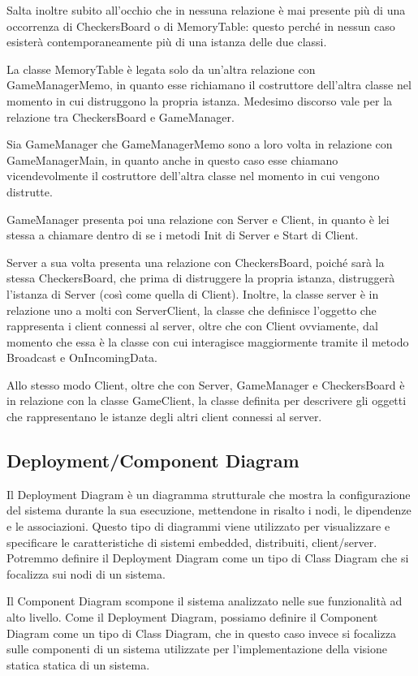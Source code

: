 \documentclass[12pt]{article}
\begin{document}
Salta inoltre subito all'occhio che in nessuna relazione è mai presente più di una occorrenza di CheckersBoard o di MemoryTable: questo perché in nessun caso esisterà contemporaneamente più di una istanza delle due classi.

La classe MemoryTable è legata solo da un'altra relazione con GameManagerMemo, in quanto esse richiamano il costruttore dell'altra classe nel momento in cui distruggono la propria istanza. Medesimo discorso vale per la relazione tra CheckersBoard e GameManager.

Sia GameManager che GameManagerMemo sono a loro volta in relazione con GameManagerMain, in quanto anche in questo caso esse chiamano vicendevolmente il costruttore dell'altra classe nel momento in cui vengono distrutte.

GameManager presenta poi una relazione con Server e Client, in quanto è lei stessa a chiamare dentro di se i metodi Init di Server e Start di Client.

Server a sua volta presenta una relazione con CheckersBoard, poiché sarà la stessa CheckersBoard, che prima di distruggere la propria istanza, distruggerà l'istanza di Server (così come quella di Client). Inoltre, la classe server è in relazione uno a molti con ServerClient, la classe che definisce l'oggetto che rappresenta i client connessi al server, oltre che con Client ovviamente, dal momento che essa è la classe con cui interagisce maggiormente tramite il metodo Broadcast e OnIncomingData.

Allo stesso modo Client, oltre che con Server, GameManager e CheckersBoard è in relazione con la classe GameClient, la classe definita per descrivere gli oggetti che rappresentano le istanze degli altri client connessi al server.

\subsection{Deployment/Component Diagram}
Il Deployment Diagram è un diagramma strutturale che mostra la configurazione del sistema durante la sua esecuzione, mettendone in risalto i nodi, le dipendenze e le associazioni. Questo tipo di diagrammi viene utilizzato per visualizzare e specificare le caratteristiche di sistemi embedded, distribuiti, client/server. Potremmo definire il Deployment Diagram come un tipo di Class Diagram che si focalizza sui nodi di un sistema.

Il Component Diagram scompone il sistema analizzato nelle sue funzionalità ad alto livello. Come il Deployment Diagram, possiamo definire il Component Diagram come un tipo di Class Diagram, che in questo caso invece si focalizza sulle componenti di un sistema utilizzate per l'implementazione della visione statica statica di un sistema.
\end{document}
